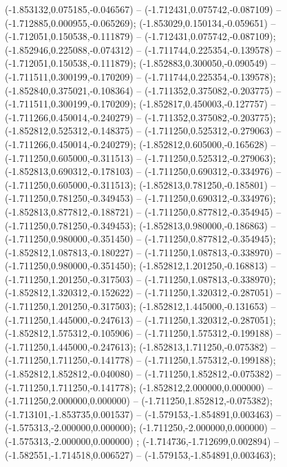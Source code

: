  (-1.853132,0.075185,-0.046567) -- (-1.712431,0.075742,-0.087109) -- (-1.712885,0.000955,-0.065269);
 (-1.853029,0.150134,-0.059651) -- (-1.712051,0.150538,-0.111879) -- (-1.712431,0.075742,-0.087109);
 (-1.852946,0.225088,-0.074312) -- (-1.711744,0.225354,-0.139578) -- (-1.712051,0.150538,-0.111879);
 (-1.852883,0.300050,-0.090549) -- (-1.711511,0.300199,-0.170209) -- (-1.711744,0.225354,-0.139578);
 (-1.852840,0.375021,-0.108364) -- (-1.711352,0.375082,-0.203775) -- (-1.711511,0.300199,-0.170209);
 (-1.852817,0.450003,-0.127757) -- (-1.711266,0.450014,-0.240279) -- (-1.711352,0.375082,-0.203775);
 (-1.852812,0.525312,-0.148375) -- (-1.711250,0.525312,-0.279063) -- (-1.711266,0.450014,-0.240279);
 (-1.852812,0.605000,-0.165628) -- (-1.711250,0.605000,-0.311513) -- (-1.711250,0.525312,-0.279063);
 (-1.852813,0.690312,-0.178103) -- (-1.711250,0.690312,-0.334976) -- (-1.711250,0.605000,-0.311513);
 (-1.852813,0.781250,-0.185801) -- (-1.711250,0.781250,-0.349453) -- (-1.711250,0.690312,-0.334976);
 (-1.852813,0.877812,-0.188721) -- (-1.711250,0.877812,-0.354945) -- (-1.711250,0.781250,-0.349453);
 (-1.852813,0.980000,-0.186863) -- (-1.711250,0.980000,-0.351450) -- (-1.711250,0.877812,-0.354945);
 (-1.852812,1.087813,-0.180227) -- (-1.711250,1.087813,-0.338970) -- (-1.711250,0.980000,-0.351450);
 (-1.852812,1.201250,-0.168813) -- (-1.711250,1.201250,-0.317503) -- (-1.711250,1.087813,-0.338970);
 (-1.852812,1.320312,-0.152622) -- (-1.711250,1.320312,-0.287051) -- (-1.711250,1.201250,-0.317503);
 (-1.852812,1.445000,-0.131653) -- (-1.711250,1.445000,-0.247613) -- (-1.711250,1.320312,-0.287051);
 (-1.852812,1.575312,-0.105906) -- (-1.711250,1.575312,-0.199188) -- (-1.711250,1.445000,-0.247613);
 (-1.852813,1.711250,-0.075382) -- (-1.711250,1.711250,-0.141778) -- (-1.711250,1.575312,-0.199188);
 (-1.852812,1.852812,-0.040080) -- (-1.711250,1.852812,-0.075382) -- (-1.711250,1.711250,-0.141778);
 (-1.852812,2.000000,0.000000) -- (-1.711250,2.000000,0.000000) -- (-1.711250,1.852812,-0.075382);
 (-1.713101,-1.853735,0.001537) -- (-1.579153,-1.854891,0.003463) -- (-1.575313,-2.000000,0.000000);
 (-1.711250,-2.000000,0.000000) -- (-1.575313,-2.000000,0.000000) ;
 (-1.714736,-1.712699,0.002894) -- (-1.582551,-1.714518,0.006527) -- (-1.579153,-1.854891,0.003463);
